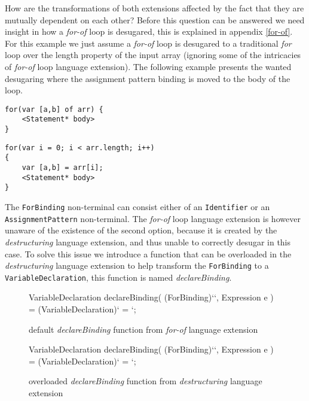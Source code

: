 How are the transformations of both extensions affected by the fact that they are mutually dependent on each other? Before this question can be answered we need insight in how a \textit{for-of} loop is desugared, this is explained in appendix \ref{for-of}. For this example we just assume a \textit{for-of} loop is desugared to a traditional \textit{for} loop over the length property of the input array (ignoring some of the intricacies of \textit{for-of} loop language extension). The following example presents the wanted desugaring where the assignment pattern binding is moved to the body of the loop. 

\begin{minipage}[t]{0.45\linewidth}
\begin{lstlisting}
for(var [a,b] of arr) {
	<Statement* body>
}
\end{lstlisting}
\end{minipage}
\hfill
\begin{minipage}[t]{0.5\linewidth}
\begin{lstlisting}
for(var i = 0; i < arr.length; i++) 
{	
	var [a,b] = arr[i];
	<Statement* body>
}
\end{lstlisting}
\end{minipage}

The \lstinline$ForBinding$ non-terminal can consist either of an \lstinline$Identifier$ or an \lstinline$AssignmentPattern$ non-terminal. The \textit{for-of} loop language extension is however unaware of the existence of the second option, because it is created by the \textit{destructuring} language extension, and thus unable to correctly desugar in this case. To solve this issue we introduce a function that can be overloaded in the \textit{destructuring} language extension to help transform the \lstinline$ForBinding$ to a \lstinline$VariableDeclaration$, this function is named \textit{declareBinding}.

\begin{figure}
\caption{default \textit{declareBinding} function from \textit{for-of} language extension}
\begin{rascal}
VariableDeclaration declareBinding( (ForBinding)``, Expression e )
    = (VariableDeclaration)` = `;
\end{rascal}
\end{figure}

\begin{figure}
\caption{overloaded \textit{declareBinding} function from \textit{destructuring} language extension}
\begin{rascal}
VariableDeclaration declareBinding( (ForBinding)``, Expression e )
    = (VariableDeclaration)` = `;
\end{rascal}
\end{figure}

